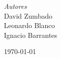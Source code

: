 	{\large\textit{Autores}}\\
	David Zumbado \\ %
	Leonardo Blanco \\
	Ignacio Barrantes
	
	
	\vfill\vfill\vfill %
	
	{\large\today} %
	
	
	 
	
	\vfill %
	
	
